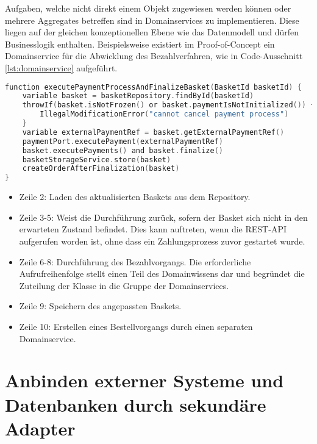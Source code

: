 Aufgaben, welche nicht direkt einem Objekt zugewiesen werden können oder mehrere Aggregates betreffen sind in Domainservices zu implementieren. Diese liegen auf der gleichen konzeptionellen Ebene wie das Datenmodell und dürfen Businesslogik enthalten. Beispielsweise existiert im Proof-of-Concept ein Domainservice für die Abwicklung des Bezahlverfahren, wie in Code-Ausschnitt \ref{lst:domainservice} aufgeführt. 


\begin{minipage}{\linewidth} %
	\begin{lstlisting}[caption={Ausführung des Bezahlvorgangs in einem Domainservice}, label={lst:domainservice}, language=Kotlin]
function executePaymentProcessAndFinalizeBasket(BasketId basketId) {
	variable basket = basketRepository.findById(basketId)
	throwIf(basket.isNotFrozen() or basket.paymentIsNotInitialized()) {
		IllegalModificationError("cannot cancel payment process")
	}
	variable externalPaymentRef = basket.getExternalPaymentRef()
	paymentPort.executePayment(externalPaymentRef)
	basket.executePayments() and basket.finalize()
	basketStorageService.store(basket)
	createOrderAfterFinalization(basket)
}
	\end{lstlisting}
\end{minipage}

\begin{itemize}[noitemsep,nolistsep]
	\item Zeile 2: Laden des aktualisierten Baskets aus dem Repository.
	\item Zeile 3-5: Weist die Durchführung zurück, sofern der Basket sich nicht in den erwarteten Zustand befindet. Dies kann auftreten, wenn die REST-API aufgerufen worden ist, ohne dass ein Zahlungsprozess zuvor gestartet wurde.
	\item Zeile 6-8: Durchführung des Bezahlvorgangs. Die erforderliche Aufrufreihenfolge stellt einen Teil des Domainwissens dar und begründet die Zuteilung der Klasse in die Gruppe der Domainservices.
	\item Zeile 9: Speichern des angepassten Baskets.
	\item Zeile 10: Erstellen eines Bestellvorgangs durch einen separaten Domainservice.
\end{itemize}

\section{Anbinden externer Systeme und Datenbanken durch sekundäre Adapter}

